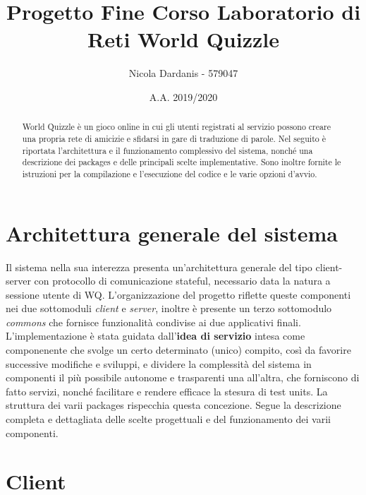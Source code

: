 \documentclass{article}
\title{Progetto Fine Corso Laboratorio di Reti \newline World Quizzle}
\author{Nicola Dardanis - 579047}
\date{A.A. 2019/2020}
\begin{document}
    \maketitle
    \newpage

    \tableofcontents
    \newpage

    \vspace{2cm} %
    \begin{abstract}
        World Quizzle è un gioco online in cui gli utenti registrati al servizio possono creare una propria rete di amicizie e sfidarsi in gare di traduzione di parole. Nel seguito è riportata l'architettura e il funzionamento complessivo del sistema, nonché una descrizione dei packages e delle principali scelte implementative. Sono inoltre fornite le istruzioni per la compilazione e l'esecuzione del codice e le varie opzioni d'avvio.
    \end{abstract}
    \newpage


    \section{Architettura generale del sistema}
    Il sistema nella sua interezza presenta un'architettura generale del tipo client-server con protocollo di comunicazione stateful, necessario data la natura a sessione utente di WQ. L'organizzazione del progetto riflette queste componenti nei due sottomoduli \emph{client} e \emph{server}, inoltre è presente un terzo sottomodulo \emph{commons} che fornisce funzionalità condivise ai due applicativi finali.
    \newline
    L'implementazione è stata guidata dall'\textbf{idea di servizio} intesa come componenente che svolge un certo determinato (unico) compito, così da favorire successive modifiche e sviluppi, e dividere la complessità del sistema in componenti il più possibile autonome e trasparenti una all'altra, che forniscono di fatto servizi, nonché facilitare e rendere efficace la stesura di test units. La struttura dei varii packages rispecchia questa concezione. Segue la descrizione completa e dettagliata delle scelte progettuali e del funzionamento dei varii componenti.

    \section{Client}
\end{document}
